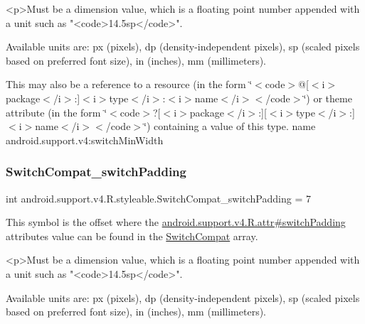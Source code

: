 \begin{DoxyVerb}      <p>Must be a dimension value, which is a floating point number appended with a unit such as "<code>14.5sp</code>".
\end{DoxyVerb}
 Available units are\+: px (pixels), dp (density-\/independent pixels), sp (scaled pixels based on preferred font size), in (inches), mm (millimeters). 

This may also be a reference to a resource (in the form \char`\"{}$<$code$>$@\mbox{[}$<$i$>$package$<$/i$>$\+:\mbox{]}$<$i$>$type$<$/i$>$\+:$<$i$>$name$<$/i$>$$<$/code$>$\char`\"{}) or theme attribute (in the form \char`\"{}$<$code$>$?\mbox{[}$<$i$>$package$<$/i$>$\+:\mbox{]}\mbox{[}$<$i$>$type$<$/i$>$\+:\mbox{]}$<$i$>$name$<$/i$>$$<$/code$>$\char`\"{}) containing a value of this type.  name android.\+support.\+v4\+:switch\+Min\+Width \mbox{\label{classandroid_1_1support_1_1v4_1_1R_1_1styleable_a0e255dd7f9b8259683f42c6b46188916}} 
\subsubsection{\texorpdfstring{Switch\+Compat\+\_\+switch\+Padding}{SwitchCompat\_switchPadding}}
{\footnotesize\ttfamily int android.\+support.\+v4.\+R.\+styleable.\+Switch\+Compat\+\_\+switch\+Padding = 7\hspace{0.3cm}{\ttfamily [static]}}

This symbol is the offset where the \hyperlink{classandroid_1_1support_1_1v4_1_1R_1_1attr_ae0ed2143b3908d058aa5f5b0551d683d}{android.\+support.\+v4.\+R.\+attr\#switch\+Padding} attribute\textquotesingle{}s value can be found in the \hyperlink{classandroid_1_1support_1_1v4_1_1R_1_1styleable_a3b46a9ea84acdcc1d9e88a54fc6f685e}{Switch\+Compat} array.

\begin{DoxyVerb}      <p>Must be a dimension value, which is a floating point number appended with a unit such as "<code>14.5sp</code>".
\end{DoxyVerb}
 Available units are\+: px (pixels), dp (density-\/independent pixels), sp (scaled pixels based on preferred font size), in (inches), mm (millimeters). 

